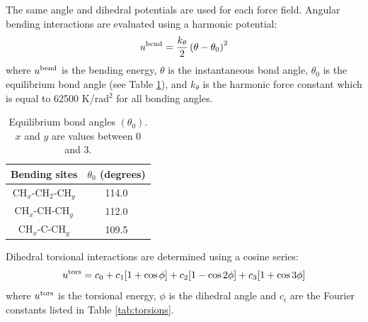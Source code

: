 \documentclass[preprint,review,12pt]{elsarticle}
\begin{document}
    
    
    The same angle and dihedral potentials are used for each force field. Angular bending interactions are evaluated using a harmonic potential:
	\begin{equation}
	u^{\rm bend} = \frac{k_\theta}{2} \left(\theta-\theta_0\right)^2
	\end{equation}
	where $u^{\rm bend}$ is the bending energy, $\theta$ is the instantaneous bond angle, $\theta_0$ is the equilibrium bond angle (see Table \ref{tab:angles}), and $k_\theta$ is the harmonic force constant which is equal to 62500 K/rad$^2$ for all bonding angles. 
	 
	\begin{table}[h!]
		\caption{Equilibrium bond angles $(\theta_0)$. $x$ and $y$ are values between 0 and 3.} \label{tab:angles}
		\begin{center}
			\begin{tabular}{|c|c|}
				\hline
				Bending sites & $\theta_0$ (degrees) \\ \hline
				CH$_x$-CH$_2$-CH$_y$ & 114.0 \\ 
				CH$_x$-CH-CH$_y$ & 112.0 \\ 
				CH$_x$-C-CH$_y$ & 109.5 \\  
				\hline
			\end{tabular}
		\end{center} 
	\end{table}
	
	Dihedral torsional interactions are determined using a cosine series:
	\begin{equation}
	u^{\rm tors} = c_0 + c_1 [1+\cos{\phi}] + c_2 [1-\cos{2\phi}] + c_3 [1+\cos{3\phi}]
	\end{equation}
	where $u^{\rm tors}$ is the torsional energy, $\phi$ is the dihedral angle and $c_i$ are the Fourier constants listed in Table \ref{tab:torsions}.
	
\end{document}
